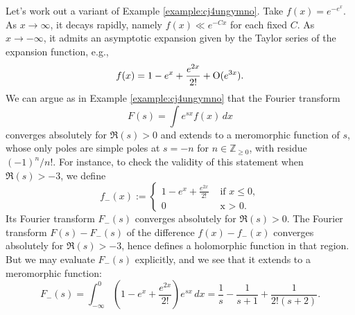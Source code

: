 \documentclass[reqno]{amsart}  \numberwithin{theorem}{section} \numberwithin{equation}{section}
\begin{document}
\begin{example}\label{example:cj4uniw25n}
  Let's work out a variant of Example \ref{example:cj4ungymno}.  Take $f(x) = e^{- e^x}$.  As $x \rightarrow \infty$, it decays rapidly, namely $f(x) \ll e^{-C x}$ for each fixed $C$.  As $x \rightarrow -\infty$, it admits an asymptotic expansion given by the Taylor series of the expansion function, e.g.,
  \begin{equation*}
f(x) = 1 - e^{x} + \frac{e^{2 x}}{2!} + \operatorname{O} (e^{3 x}).
  \end{equation*}
  We can argue as in Example \ref{example:cj4ungymno} that the Fourier transform
  \begin{equation*}
F(s) = \int e^{s x } f(x) \, d x
  \end{equation*}
  converges absolutely for $\Re(s) > 0$ and extends to a meromorphic function of $s$, whose only poles are simple poles at $s = -n$ for $n \in \mathbb{Z}_{\geq 0}$, with residue $(-1)^n / n!$.  For instance, to check the validity of this statement when $\Re(s) > -3$, we define
  \begin{equation*}
f_-(x) :=
\begin{cases}
1 - e^x + \frac{e^{2 x }}{ 2 !} & \text{ if } x \leq 0, \\
0 & \text{ x > 0.}
\end{cases}
  \end{equation*}
  Its Fourier transform $F_-(s)$ converges absolutely for $\Re(s) > 0$.  The Fourier transform $F(s) - F_-(s)$ of the difference $f(x) - f_-(x)$ converges absolutely for $\Re(s) > -3$, hence defines a holomorphic function in that region.  But we may evaluate $F_-(s)$ explicitly, and we see that it extends to a meromorphic function:
  \begin{equation}\label{eq:cj4uni5pkc}
    F_-(s) = \int _{-\infty}^0 \left( 1 - e^x + \frac{e^{2 x }}{ 2!} \right) e^{s x} \, d x
    =
    \frac{1}{s} - \frac{1}{s + 1} + \frac{1}{2 ! (s + 2)}.
\end{equation}  
\end{example}
\end{document}
